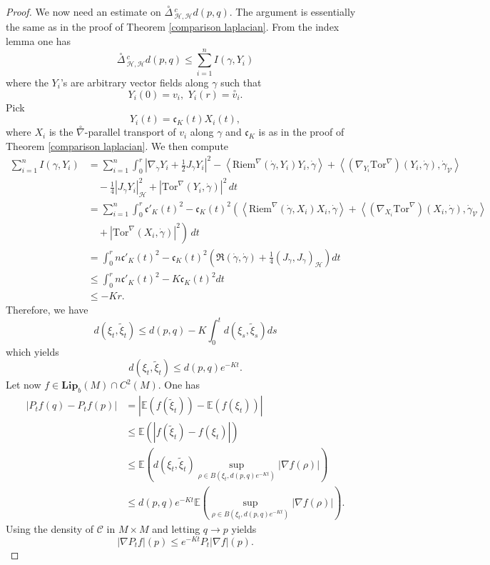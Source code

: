\documentclass[10pt,a4paper]{amsart}
\newcommand{\Ho}{\mathcal H}
\newcommand{\Tor}{\mathrm{Tor}}
\newcommand{\V}{\mathcal V}
\begin{document}
\begin{proof}
We now need an estimate on $\overset{\circ}{\Delta}\,^c_{\Ho,\Ho} d (p,q)$. The argument is essentially the same as in the proof of Theorem \ref{comparison laplacian}. From the index lemma one has
\[
\overset{\circ}{\Delta}\,^c_{\Ho,\Ho} d (p,q) \le  \sum_{i=1}^n I(\gamma,Y_i)
\]
where the $Y_i$'s are arbitrary vector fields along $\gamma$ such that
\[
Y_i(0)=v_i, \, \, Y_i(r)=\overset{\circ}{v}_i.
\]
Pick
\[
Y_i(t)=\mathfrak{c}_K (t) X_i(t),
\]
where $X_i$ is the $\overset{\circ}{\nabla}$-parallel transport of $v_i$ along $\gamma$ and $\mathfrak{c}_K$ is as in the proof of Theorem \ref{comparison laplacian}. We then compute
\begin{align*}
 \sum_{i=1}^n I(\gamma,Y_i)  &=  \sum_{i=1}^n  \int_0^r  \left | \nabla_{\dot \gamma}  Y_i +\frac{1}{2} J_{\dot \gamma}  Y_i   \right|^2  -\left \langle \mathrm{Riem}^\nabla(\dot \gamma,Y_i)Y_i, \dot \gamma \right \rangle  +\left\langle (\nabla_{Y_i} \Tor^\nabla)(Y_i,\dot\gamma),\dot \gamma_\V \right\rangle\\
 &\quad -\frac{1}{4} | J_{\dot \gamma} Y_i |^2_\Ho+ |\Tor^\nabla(Y_i,\dot\gamma)|^2 \, dt \\
 &=\sum_{i=1}^n  \int_0^r  \mathfrak{c}'_K(t)^2  - \mathfrak{c}_K(t)^2 \left(  \left \langle \mathrm{Riem}^\nabla(\dot \gamma,X_i)X_i, \dot \gamma \right \rangle  +\left\langle (\nabla_{X_i} \Tor^\nabla)(X_i,\dot\gamma),\dot \gamma_\V \right\rangle \right. \\
 &\left. \quad + |\Tor^\nabla(X_i,\dot\gamma)|^2 \right) \, dt \\
 &=  \int_0^r n  \mathfrak{c}'_K(t)^2-\mathfrak{c}_K(t)^2\left( \mathfrak{R}(\dot \gamma,\dot \gamma) +\frac{1}{4} (J_{\dot \gamma},J_{\dot \gamma})_\Ho \right)dt \\
 &\le  \int_0^r n  \mathfrak{c}'_K(t)^2- K \mathfrak{c}_K(t)^2  dt \\
 &\le -Kr.
\end{align*}
Therefore, we have
\[
d(\xi_t,\tilde{\xi}_t) \le d(p,q)-K \int_0^t d(\xi_s,\tilde{\xi}_s) ds
\]
which yields
\[
d(\xi_t,\tilde{\xi}_t) \le  d(p,q) e^{-Kt}.
\]
Let now $f \in \mathbf{Lip}_b (M)\cap C^2(M)$. One has
\begin{align*}
|P_tf(q)-P_tf(p)|&= \left| \mathbb{E} \left( f(\tilde{\xi}_t) \right)- \mathbb{E}\left(f(\xi_t)\right) \right| \\
 &\le \mathbb{E} \left( \left| f(\tilde{\xi}_t)- f(\xi_t)\right| \right) \\
 &\le   \mathbb{E} \left(d(\xi_t,\tilde{\xi}_t)  \sup_{\rho \in B(\xi_t,d(p,q) e^{-Kt})} \left| \nabla f (\rho)\right| \right) \\
 &\le d(p,q) e^{-Kt}\mathbb{E} \left(  \sup_{\rho \in B(\xi_t,d(p,q) e^{-Kt})} \left| \nabla f (\rho)\right| \right).
\end{align*} 
Using the density of $\mathcal{C}$ in $M\times M$ and letting $q \to p$ yields
\[
|\nabla P_t f|(p)\le e^{-Kt} P_t |\nabla f| (p).
\]
\end{proof}
\end{document}

